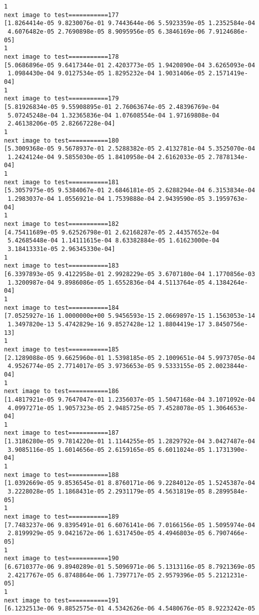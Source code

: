 \documentclass[11pt]{article}
\begin{document}
\begin{Verbatim}[commandchars=\\\{\}]
1
next image to test===========177
[1.8264414e-05 9.8230076e-01 9.7443644e-06 5.5923359e-05 1.2352584e-04
 4.6076482e-05 2.7690898e-05 8.9095956e-05 6.3846169e-06 7.9124686e-05]
1
next image to test===========178
[5.0686896e-05 9.6417344e-01 2.4203773e-05 1.9420890e-04 3.6265093e-04
 1.0984430e-04 9.0127534e-05 1.8295232e-04 1.9031406e-05 2.1571419e-04]
1
next image to test===========179
[5.81926834e-05 9.55908895e-01 2.76063674e-05 2.48396769e-04
 5.07245248e-04 1.32365836e-04 1.07608554e-04 1.97169808e-04
 2.46138206e-05 2.82667228e-04]
1
next image to test===========180
[5.3009368e-05 9.5678937e-01 2.5288382e-05 2.4132781e-04 5.3525070e-04
 1.2424124e-04 9.5855030e-05 1.8410958e-04 2.6162033e-05 2.7878134e-04]
1
next image to test===========181
[5.3057975e-05 9.5384067e-01 2.6846181e-05 2.6288294e-04 6.3153834e-04
 1.2983037e-04 1.0556921e-04 1.7539888e-04 2.9439590e-05 3.1959763e-04]
1
next image to test===========182
[4.75411689e-05 9.62526798e-01 2.62168287e-05 2.44357652e-04
 5.42685448e-04 1.14111615e-04 8.63382884e-05 1.61623000e-04
 3.18413331e-05 2.96345330e-04]
1
next image to test===========183
[6.3397893e-05 9.4122958e-01 2.9928229e-05 3.6707180e-04 1.1770856e-03
 1.3200987e-04 9.8986086e-05 1.6552836e-04 4.5113764e-05 4.1384264e-04]
1
next image to test===========184
[7.0525927e-16 1.0000000e+00 5.9456593e-15 2.0669897e-15 1.1563053e-14
 1.3497820e-13 5.4742829e-16 9.8527428e-12 1.8804419e-17 3.8450756e-13]
1
next image to test===========185
[2.1289088e-05 9.6625960e-01 1.5398185e-05 2.1009651e-04 5.9973705e-04
 4.9526774e-05 2.7714017e-05 3.9736653e-05 9.5333155e-05 2.0023844e-04]
1
next image to test===========186
[1.4817921e-05 9.7647047e-01 1.2356037e-05 1.5047168e-04 3.1071092e-04
 4.0997271e-05 1.9057323e-05 2.9485725e-05 7.4528078e-05 1.3064653e-04]
1
next image to test===========187
[1.3186280e-05 9.7814220e-01 1.1144255e-05 1.2829792e-04 3.0427487e-04
 3.9085116e-05 1.6014656e-05 2.6159165e-05 6.6011024e-05 1.1731390e-04]
1
next image to test===========188
[1.0392669e-05 9.8536545e-01 8.8760171e-06 9.2284012e-05 1.5245387e-04
 3.2228028e-05 1.1868431e-05 2.2931179e-05 4.5631819e-05 8.2899584e-05]
1
next image to test===========189
[7.7483237e-06 9.8395491e-01 6.6076141e-06 7.0166156e-05 1.5095974e-04
 2.8199929e-05 9.0421672e-06 1.6317450e-05 4.4946803e-05 6.7907466e-05]
1
next image to test===========190
[6.6710377e-06 9.8940289e-01 5.5096971e-06 5.1313116e-05 8.7921369e-05
 2.4217767e-05 6.8748864e-06 1.7397717e-05 2.9579396e-05 5.2121231e-05]
1
next image to test===========191
[6.1232513e-06 9.8852575e-01 4.5342626e-06 4.5480676e-05 8.9223242e-05

\end{Verbatim}
\end{document}
